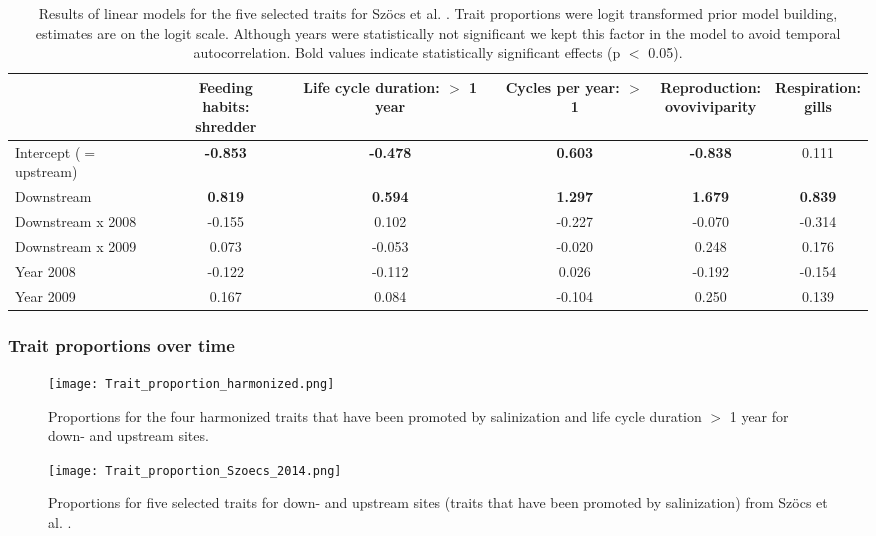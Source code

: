 \documentclass[../Draft_harmonization_paper.tex]{subfiles}
\begin{document}
\begin{table}[ht]
    \centering
    \caption{Results of linear models for the five selected traits for Szöcs et al. \cite{szocs_effects_2014}. Trait proportions were logit transformed prior model building, estimates are on the logit scale.
    Although years were statistically not significant we kept this factor in the model to avoid temporal autocorrelation. Bold values indicate statistically
    significant effects (p $<$ 0.05).}
    \label{stab:linear_models_edi}
    \begin{tabular}{l|ccccc}
    \toprule[.1em]
    & \specialcell{Feeding habits:\\ shredder} & \specialcell{Life cycle duration:\\ $>$ 1 year} & \specialcell {Cycles per year:\\ $>$ 1} & \specialcell{Reproduction:\\ ovoviviparity} & \specialcell{Respiration:\\ gills} \\ 
    \toprule[.1em]
    Intercept ($=$ upstream) & \textbf{-0.853} & \textbf{-0.478} & \textbf{0.603} & \textbf{-0.838} & 0.111 \\ 
    Downstream & \textbf{0.819} & \textbf{0.594} & \textbf{1.297} & \textbf{1.679} & \textbf{0.839} \\ 
    Downstream x 2008 & -0.155 & 0.102 & -0.227 & -0.070 & -0.314 \\ 
    Downstream x 2009 & 0.073 & -0.053 & -0.020 & 0.248 & 0.176 \\ 
    Year 2008 & -0.122 & -0.112 & 0.026 & -0.192 & -0.154 \\ 
    Year 2009 & 0.167 & 0.084 & -0.104 & 0.250 & 0.139 \\ 
    \bottomrule
    \end{tabular} 
\end{table}


\subsubsection*{Trait proportions over time}
\begin{figure}[H]
    \centering
    \texttt{[image: Trait\_proportion\_harmonized.png]}
    \caption{Proportions for the four harmonized traits that have been promoted by salinization and life cycle duration $>$ 1 year for down- and upstream sites.
    } 
\end{figure}

\begin{figure}[H]
    \centering
    \texttt{[image: Trait\_proportion\_Szoecs\_2014.png]}
    \caption{Proportions for five selected traits for down- and upstream sites (traits that have been promoted by salinization) from Szöcs et al. \cite{szocs_effects_2014}.} 
\end{figure}
\end{document}
